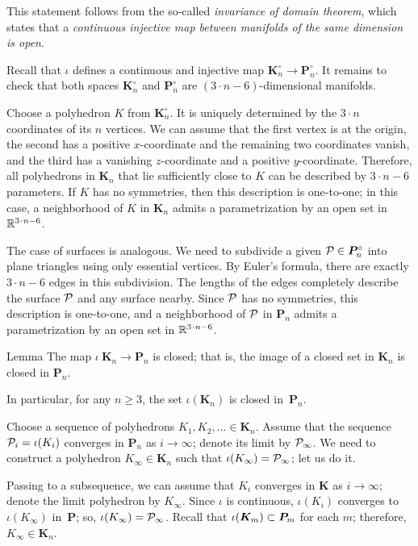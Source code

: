This statement follows from the so-called \emph{invariance of domain theorem},
which states that a \textit{continuous injective map between manifolds of the same dimension is open}.

Recall that $\iota$ defines a continuous and injective map $\bm{K}_n^\circ\to\bm{P}_n^\circ$.
It remains to check that both spaces $\bm{K}_n^\circ$ and $\bm{P}_n^\circ$ are $(3\cdot n-6)$-dimensional manifolds.

Choose a polyhedron $K$ from $\bm{K}_n^\circ$.
It is uniquely determined by the $3\cdot n$ coordinates of its $n$ vertices.
We can assume that the first vertex is at the origin,
the second has a positive $x$-coordinate
and the remaining two coordinates vanish,
and the third has a vanishing $z$-coordinate and a positive $y$-coordinate.
Therefore, all polyhedrons in $\bm{K}_n$ that lie sufficiently close to $K$ can be described by $3\cdot n-6$ parameters.
If $K$ has no symmetries, then this description is one-to-one;
in this case, a neighborhood of $K$ in $\bm{K}_n$ admits a parametrization by an open set in $\RR^{3\cdot n-6}$.

The case of surfaces is analogous.
We need to subdivide a given $\mathcal{P}\in\bm{P}_n^\circ$ into plane triangles using only essential vertices.
By Euler's formula, there are exactly $3\cdot n-6$ edges in this subdivision.
The lengths of the edges completely describe the surface $\mathcal{P}$ and any surface nearby.
Since $\mathcal{P}$ has no symmetries, this description is one-to-one, and a neighborhood of $\mathcal{P}$ in $\bm{P}_n$ admits a parametrization by an open set in $\RR^{3\cdot n-6}$.

\begin{thm}{Lemma}\label{lem:closed}
The map $\iota\:\bm{K}_n\to\bm{P}_n$ is closed;
that is, the image of a closed set in $\bm{K}_n$ is closed in $\bm{P}_n$.

In particular, for any $n\ge 3$, the set $\iota(\bm{K}_n)$ is closed in~$\bm{P}_n$.
\end{thm}

Choose a sequence of polyhedrons $K_1,K_2,\ldots\in\bm{K}_n$.
Assume that the sequence $\mathcal{P}_i=\iota(K_i)$ converges in $\bm{P}_n$ as $i\to \infty$;
denote its limit by $\mathcal{P}_\infty$.
We need to construct a polyhedron $K_\infty\in \bm{K}_n$ such that $\iota(K_\infty)=\mathcal{P}_\infty$;
let us do it.

Passing to a subsequence, we can assume that $K_i$ converges in $\bm{K}$ as $i\to\infty$;
denote the limit polyhedron by $K_\infty$.
Since $\iota$ is continuous, $\iota(K_i)$ converges to $\iota(K_\infty)$ in~$\bm{P}$; so, $\iota(K_\infty)=\mathcal{P}_\infty$.
Recall that $\iota(\bm{K}_m)\z\subset\bm{P}_m$ for each $m$; therefore, $K_\infty\in \bm{K}_n$.


